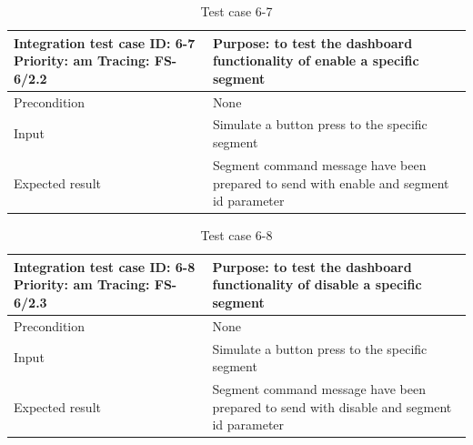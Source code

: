 \begin{table}[H]
	\caption{Test case 6-7}
	\label{table:TCase-FS6-7}
	\begin{center}
		\renewcommand{\arraystretch}{1.8}
		\begin{tabu} 
			to 0.9 \textwidth
			{  X[0.4, c] X[c] }
			\toprule
			Integration test case ID: 6-7 \newline Priority: am \newline Tracing: FS-6/2.2 & Purpose: to test the dashboard functionality of enable a specific segment               \\ \midrule
			Precondition                                                                   & None                                                                           \\
			Input                                                                          & Simulate a button press to the specific segment                                \\
			Expected result                                                                & Segment command message have been prepared to send with enable and segment id parameter \\ \bottomrule
		\end{tabu}
	\end{center}
\end{table}

\begin{table}[H]
	\caption{Test case 6-8}
	\label{table:TCase-FS6-8}
	\begin{center}
		\renewcommand{\arraystretch}{1.8}
		\begin{tabu} 
			to 0.9 \textwidth
			{  X[0.4, c] X[c] }
			\toprule
			Integration test case ID: 6-8 \newline Priority: am \newline Tracing: FS-6/2.3 & Purpose: to test the dashboard functionality of disable a specific segment               \\ \midrule
			Precondition                                                                   & None                                                                           \\
			Input                                                                          & Simulate a button press to the specific segment                                \\
			Expected result                                                                & Segment command message have been prepared to send with disable and segment id parameter \\ \bottomrule
		\end{tabu}
	\end{center}
\end{table}







